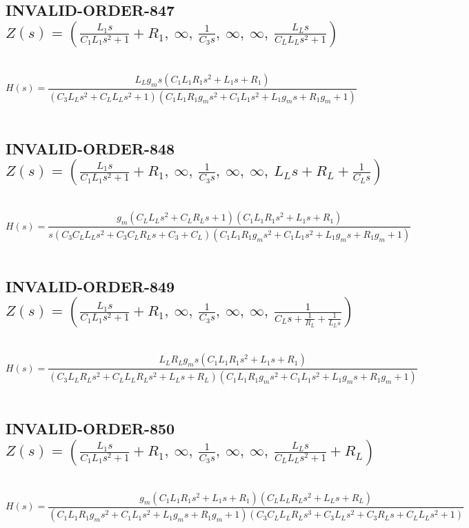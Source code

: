 \documentclass{article}
\begin{document}
\subsection{INVALID-ORDER-847 $Z(s) = \left( \frac{L_{1} s}{C_{1} L_{1} s^{2} + 1} + R_{1}, \  \infty, \  \frac{1}{C_{3} s}, \  \infty, \  \infty, \  \frac{L_{L} s}{C_{L} L_{L} s^{2} + 1}\right)$ } \ 
\textbf{\[H(s) = \frac{L_{L} g_{m} s \left(C_{1} L_{1} R_{1} s^{2} + L_{1} s + R_{1}\right)}{\left(C_{3} L_{L} s^{2} + C_{L} L_{L} s^{2} + 1\right) \left(C_{1} L_{1} R_{1} g_{m} s^{2} + C_{1} L_{1} s^{2} + L_{1} g_{m} s + R_{1} g_{m} + 1\right)}\] } \ 
\subsection{INVALID-ORDER-848 $Z(s) = \left( \frac{L_{1} s}{C_{1} L_{1} s^{2} + 1} + R_{1}, \  \infty, \  \frac{1}{C_{3} s}, \  \infty, \  \infty, \  L_{L} s + R_{L} + \frac{1}{C_{L} s}\right)$ } \ 
\textbf{\[H(s) = \frac{g_{m} \left(C_{L} L_{L} s^{2} + C_{L} R_{L} s + 1\right) \left(C_{1} L_{1} R_{1} s^{2} + L_{1} s + R_{1}\right)}{s \left(C_{3} C_{L} L_{L} s^{2} + C_{3} C_{L} R_{L} s + C_{3} + C_{L}\right) \left(C_{1} L_{1} R_{1} g_{m} s^{2} + C_{1} L_{1} s^{2} + L_{1} g_{m} s + R_{1} g_{m} + 1\right)}\] } \ 
\subsection{INVALID-ORDER-849 $Z(s) = \left( \frac{L_{1} s}{C_{1} L_{1} s^{2} + 1} + R_{1}, \  \infty, \  \frac{1}{C_{3} s}, \  \infty, \  \infty, \  \frac{1}{C_{L} s + \frac{1}{R_{L}} + \frac{1}{L_{L} s}}\right)$ } \ 
\textbf{\[H(s) = \frac{L_{L} R_{L} g_{m} s \left(C_{1} L_{1} R_{1} s^{2} + L_{1} s + R_{1}\right)}{\left(C_{3} L_{L} R_{L} s^{2} + C_{L} L_{L} R_{L} s^{2} + L_{L} s + R_{L}\right) \left(C_{1} L_{1} R_{1} g_{m} s^{2} + C_{1} L_{1} s^{2} + L_{1} g_{m} s + R_{1} g_{m} + 1\right)}\] } \ 
\subsection{INVALID-ORDER-850 $Z(s) = \left( \frac{L_{1} s}{C_{1} L_{1} s^{2} + 1} + R_{1}, \  \infty, \  \frac{1}{C_{3} s}, \  \infty, \  \infty, \  \frac{L_{L} s}{C_{L} L_{L} s^{2} + 1} + R_{L}\right)$ } \ 
\textbf{\[H(s) = \frac{g_{m} \left(C_{1} L_{1} R_{1} s^{2} + L_{1} s + R_{1}\right) \left(C_{L} L_{L} R_{L} s^{2} + L_{L} s + R_{L}\right)}{\left(C_{1} L_{1} R_{1} g_{m} s^{2} + C_{1} L_{1} s^{2} + L_{1} g_{m} s + R_{1} g_{m} + 1\right) \left(C_{3} C_{L} L_{L} R_{L} s^{3} + C_{3} L_{L} s^{2} + C_{3} R_{L} s + C_{L} L_{L} s^{2} + 1\right)}\] } \ 
\end{document}
